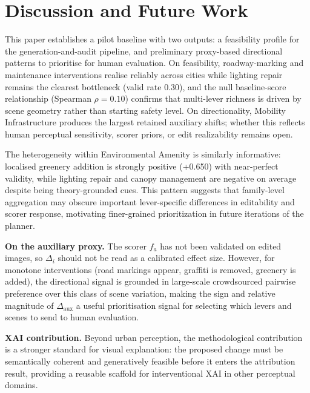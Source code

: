 \section{Discussion and Future Work}
\label{sec:discussion}

This paper establishes a pilot baseline with two outputs: a feasibility profile for the generation-and-audit pipeline, and preliminary proxy-based directional patterns to prioritise for human evaluation. On feasibility, roadway-marking and maintenance interventions realise reliably across cities while lighting repair remains the clearest bottleneck (valid rate 0.30), and the null baseline-score relationship (Spearman $\rho{=}0.10$) confirms that multi-lever richness is driven by scene geometry rather than starting safety level. On directionality, Mobility Infrastructure produces the largest retained auxiliary shifts; whether this reflects human perceptual sensitivity, scorer priors, or edit realizability remains open.

The heterogeneity within Environmental Amenity is similarly informative: localised greenery addition is strongly positive (+0.650) with near-perfect validity, while lighting repair and canopy management are negative on average despite being theory-grounded cues. This pattern suggests that family-level aggregation may obscure important lever-specific differences in editability and scorer response, motivating finer-grained prioritization in future iterations of the planner.


\noindent\textbf{On the auxiliary proxy.} The scorer $f_a$ has not been validated on edited images, so $\Delta_i$ should not be read as a calibrated effect size. However, for monotone interventions (road markings appear, graffiti is removed, greenery is added), the directional signal is grounded in large-scale crowdsourced pairwise preference over this class of scene variation, making the sign and relative magnitude of $\Delta_{\mathrm{aux}}$ a useful prioritisation signal for selecting which levers and scenes to send to human evaluation.



\noindent\textbf{XAI contribution.} Beyond urban perception, the methodological contribution is a stronger standard for visual explanation: the proposed change must be semantically coherent and generatively feasible before it enters the attribution result, providing a reusable scaffold for interventional XAI in other perceptual domains.



